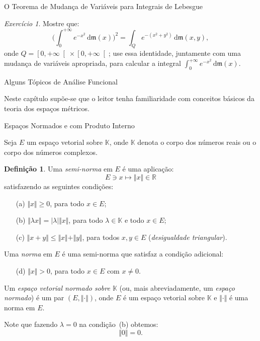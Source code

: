 \documentclass[oneside,final,11pt]{amsbook}
\newcommand{\R}{\mathds R}
\newcommand{\K}{\mathds K}
\newcommand{\leb}{\mathfrak m}
\newcommand{\dd}{\mathrm d}
\theoremstyle{remark}\newtheorem{exercise}{Exercício}[chapter]
\theoremstyle{remark}\newtheorem{*exercise}[exercise]{\hbox to 0pt{\hskip 0pt minus 1fil*}Exercício}
\theoremstyle{definition}\newtheorem{exdefin}{Definição}[chapter]
\theoremstyle{plain}\newtheorem{teo}{Teorema}[section]
\theoremstyle{plain}\newtheorem{lem}[teo]{Lema}
\theoremstyle{plain}\newtheorem{prop}[teo]{Proposição}
\theoremstyle{plain}\newtheorem{cor}[teo]{Corolário}
\theoremstyle{definition}\newtheorem{defin}[teo]{Definição}
\theoremstyle{remark}\newtheorem{rem}[teo]{Observação}
\theoremstyle{definition}\newtheorem{notation}[teo]{Notação}
\theoremstyle{definition}\newtheorem{convention}[teo]{Convenção}
\theoremstyle{definition}\newtheorem{example}[teo]{Exemplo}
\numberwithin{section}{chapter}
\numberwithin{equation}{section}
\begin{document}
\begin{chapter}{O Teorema de Mudança de Variáveis para Integrais de Lebesgue}
\begin{exercise}\label{exe:integralGauss}
Mostre que:
\[\Big(\int_0^{+\infty}e^{-x^2}\,\dd\leb(x)\Big)^2=\int_Qe^{-(x^2+y^2)}\,\dd\leb(x,y),\]
onde $Q=\left[0,+\infty\right[\times\left[0,+\infty\right[$; use essa identidade,
juntamente com uma mudança de variáveis apropriada, para calcular a integral
$\int_0^{+\infty}e^{-x^2}\,\dd\leb(x)$.
\end{exercise}

\end{chapter}

\begin{chapter}{Alguns Tópicos de Análise Funcional}
\label{CHP:TOPANFUNC}

Neste capítulo supõe-se que o leitor tenha familiaridade com conceitos básicos da teoria dos espaços métricos.

\begin{section}{Espaços Normados e com Produto Interno}

Seja $E$ um espaço vetorial sobre $\K$,\index[simbolos]{$\K$} onde $\K$ denota o corpo dos números reais ou o corpo dos números complexos.
\begin{defin}
Uma {\em semi-norma\/} em $E$ é uma aplicação:\index[simbolos]{$\Vert\cdot\Vert$}
\[E\ni x\longmapsto\Vert x\Vert\in\R\]
satisfazendo as seguintes condições:
\begin{itemize}
\item[(a)] $\Vert x\Vert\ge0$, para todo $x\in E$;
\item[(b)] $\Vert\lambda x\Vert=\vert\lambda\vert\Vert x\Vert$, para todo $\lambda\in\K$ e todo $x\in E$;
\item[(c)] $\Vert x+y\Vert\le\Vert x\Vert+\Vert y\Vert$, para todos $x,y\in E$ ({\em desigualdade triangular}).
\end{itemize}
Uma {\em norma\/} em $E$ é uma semi-norma que satisfaz a condição adicional:
\begin{itemize}
\item[(d)] $\Vert x\Vert>0$, para todo $x\in E$ com $x\ne0$.
\end{itemize}
Um {\em espaço vetorial normado sobre $\K$\/}
(ou, mais abreviadamente, um {\em espaço normado}) é um par
$(E,\Vert\cdot\Vert)$, onde $E$ é um espaço vetorial sobre $\K$ e $\Vert\cdot\Vert$ é uma norma em $E$.
\end{defin}
Note que fazendo $\lambda=0$ na condição~(b) obtemos:
\[\Vert0\Vert=0.\]


\end{section}
\end{chapter}
\end{document}
